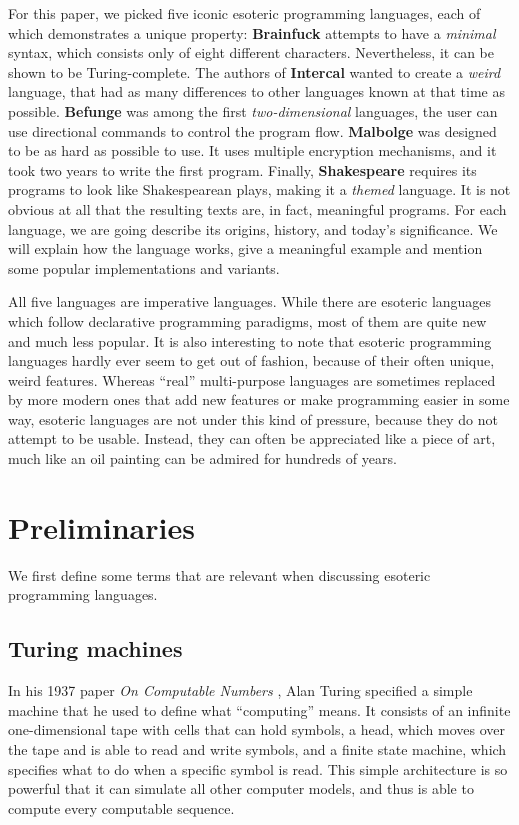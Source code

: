 \documentclass{sig-alternate}
\begin{document}
For this paper, we picked five iconic esoteric programming languages, each of which demonstrates a unique property:
\textbf{Brainfuck} attempts to have a \textit{minimal} syntax, which consists only of eight different characters. Nevertheless, it can be shown to be Turing-complete. The authors of \textbf{Intercal} wanted to create a \textit{weird} language, that had as many differences to other languages known at that time as possible. \textbf{Befunge} was among the first \textit{two-dimensional} languages, the user can use directional commands to control the program flow. \textbf{Malbolge} was designed to be as hard as possible to use. It uses multiple encryption mechanisms, and it took two years to write the first program. Finally, \textbf{Shakespeare} requires its programs to look like Shakespearean plays, making it a \textit{themed} language. It is not obvious at all that the resulting texts are, in fact, meaningful programs. For each language, we are going describe its origins, history, and today's significance. We will explain how the language works, give a meaningful example and mention some popular implementations and variants. 

All five languages are imperative languages. While there are esoteric languages which follow declarative programming paradigms, most of them are quite new and much less popular. It is also interesting to note that esoteric programming languages hardly ever seem to get out of fashion, because of their often unique, weird features. Whereas “real” multi-purpose languages are sometimes replaced by more modern ones that add new features or make programming easier in some way, esoteric languages are not under this kind of pressure, because they do not attempt to be usable. Instead, they can often be appreciated like a piece of art, much like an oil painting can be admired for hundreds of years.

\section{Preliminaries}

We first define some terms that are relevant when discussing esoteric programming languages.

\subsection{Turing machines}

In his 1937 paper \emph{On Computable Numbers} \cite{turing1937computable}, Alan Turing specified a simple machine that he used to define what “computing” means. It consists of an infinite one-dimensional tape with cells that can hold symbols, a head, which moves over the tape and is able to read and write symbols, and a finite state machine, which specifies what to do when a specific symbol is read. This simple architecture is so powerful that it can simulate all other computer models, and thus is able to compute every computable sequence.
\end{document}
